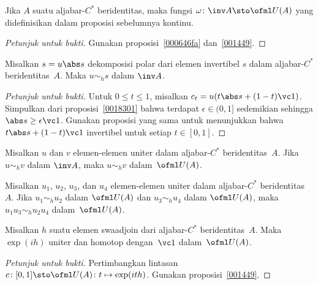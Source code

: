 \begin{prop}\label{K002021} Jika $A$ suatu aljabar-$C^*$ beridentitas, maka fungsi $\omega\colon \inv A \sto \ofml U(A)$
yang didefinisikan dalam proposisi sebelumnya kontinu.
\end{prop}

\begin{proof}[\emph{Petunjuk untuk bukti}] Gunakan proposisi~\ref{000646fa} dan~\ref{001449}.   \ns
\end{proof}

\begin{prop}\label{K002024} Misalkan $s = u\abs s$ dekomposisi polar dari elemen invertibel $s$ dalam aljabar-$C^*$ beridentitas~$A$.
Maka $u \sim_h s$ dalam $\inv A$.
\end{prop}

\begin{proof}[\emph{Petunjuk untuk bukti}] Untuk $0 \le t \le 1$, misalkan $c_t = u(t\abs s + (1 - t)\vc 1)$. Simpulkan dari
proposisi~\ref{0018301} bahwa terdapat $\epsilon \in (0,1]$ sedemikian sehingga $\abs s \ge \epsilon \vc 1$. Gunakan proposisi yang sama
untuk menunjukkan bahwa $t\abs s + (1 - t)\vc 1$ invertibel untuk setiap $t \in [0,1]$.   \ns
\end{proof}

\begin{prop}\label{K002027} Misalkan $u$ dan $v$ elemen-elemen uniter dalam aljabar-$C^*$ beridentitas~$A$. Jika $u \sim_h v$ dalam $\inv A$,
maka $u \sim_h v$ dalam~$\ofml U(A)$.
\end{prop}

\begin{prop}\label{K002031} Misalkan $u_1$, $u_2$, $u_3$, dan $u_4$ elemen-elemen uniter dalam aljabar-$C^*$ beridentitas~$A$.
Jika $u_1 \sim_h u_2$ dalam $\ofml U(A)$ dan $u_3 \sim_h u_4$ dalam $\ofml U(A)$, maka $u_1u_3 \sim_h u_2u_4$ dalam~$\ofml U(A)$.
\end{prop}

\begin{exam}\label{0060116} Misalkan $h$ suatu elemen swaadjoin dari aljabar-$C^*$ beridentitas~$A$. Maka $\exp(ih)$ uniter dan
homotop dengan~$\vc 1$ dalam~$\ofml U(A)$.
\end{exam}

\begin{proof}[\emph{Petunjuk untuk bukti}] Pertimbangkan lintasan $c\colon [0,1] \sto \ofml U(A)\colon t \mapsto \exp(ith)$. Gunakan %
proposisi~\ref{001449}.  \ns
\end{proof}

